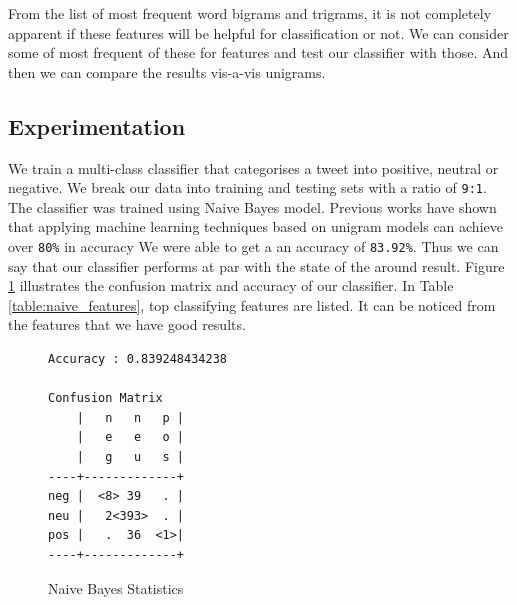 From the list of most frequent word bigrams and trigrams, it is not completely apparent if these features will be helpful
	for classification or not.
We can consider some of most frequent of these for features and test our classifier with those.
And then we can compare the results vis-a-vis unigrams.

\subsection{Experimentation}
We train a multi-class classifier that categorises a tweet into positive, neutral or negative.
We break our data into training and testing sets with a ratio of \verb'9:1'.
The classifier was trained using Naive Bayes model. %
Previous works have shown that applying machine learning techniques based on unigram models can achieve over \verb'80%' in accuracy \cite{survey}
We were able to get a an accuracy of \verb'83.92%'.
Thus we can say that our classifier performs at par with the state of the around result.
Figure \ref{fig:naive_accuracy} illustrates the confusion matrix and accuracy of our classifier.
In Table \ref{table:naive_features}, top classifying features are listed.
It can be noticed from the features that we have good results.

\begin{figure}[h]
\centering
\begin{varwidth}[t]{\textwidth}
	\begin{verbatim}
Accuracy : 0.839248434238

Confusion Matrix
    |   n   n   p |
    |   e   e   o |
    |   g   u   s |
----+-------------+
neg |  <8> 39   . |
neu |   2<393>  . |
pos |   .  36  <1>|
----+-------------+
	\end{verbatim}
\end{varwidth}
\caption{Naive Bayes Statistics}
\label{fig:naive_accuracy}
\end{figure}

